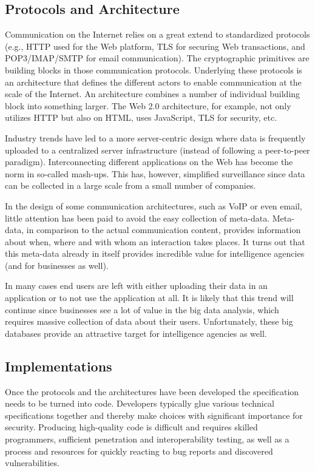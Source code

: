 \documentclass[peerreview, a4paper, 7pt]{IEEEtran}
\begin{document}
\subsection{Protocols and Architecture}

Communication on the Internet relies on a great extend to standardized protocols (e.g., HTTP used for the Web platform, TLS for securing Web transactions, and POP3/IMAP/SMTP for email communication). The cryptographic primitives are building blocks in those communication protocols. Underlying these protocols is an architecture that defines the different actors to enable communication at the scale of the Internet. An architecture combines a number of individual building block into something larger. The Web 2.0 architecture, for example, not only utilizes HTTP but also on HTML, uses JavaScript, TLS for security, etc. 

Industry trends have led to a more server-centric design where data is frequently uploaded to a centralized server infrastructure (instead of following a peer-to-peer paradigm). Interconnecting different applications on the Web has become the norm in so-called mash-ups. This has, however, simplified surveillance since data can be collected in a large scale from a small number of companies. 

In the design of some communication architectures, such as VoIP or even email, little attention has been paid to avoid the easy collection of meta-data. Meta-data, in comparison to the actual communication content, provides information about when, where and with whom an interaction takes places. It turns out that this meta-data already in itself provides incredible value for intelligence agencies (and for businesses as well).

In many cases end users are left with either uploading their data in an application or to not use the application at all. It is likely that this trend will continue since businesses see a lot of value in the big data analysis, which requires massive collection of data about their users. Unfortunately, these big databases provide an attractive target for intelligence agencies as well.

\subsection{Implementations}

Once the protocols and the architectures have been developed the specification needs to be turned into code. Developers typically glue various technical specifications together and thereby make choices with significant importance for security. Producing high-quality code is difficult and requires skilled programmers, sufficient penetration and interoperability testing, as well as a process and resources for quickly reacting to bug reports and discovered vulnerabilities.  
\end{document}
